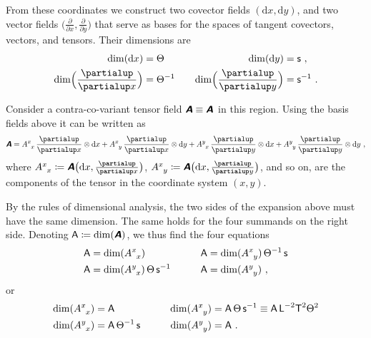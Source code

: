 \documentclass[\ifafour a4paper,12pt,\else a5paper,10pt,\fi%
onecolumn,oneside,article,%
british%
]{memoir}
\makeatletter
\theoremstyle{remark}
\theoremstyle{innote}
\newcommand*{\mathte}[1]{\textbf{\textit{\textsf{#1}}}}
\newcommand*{\de}{\partialup}%
\newcommand*{\di}{\mathrm{d}}%
\newcommand*{\defd}{\coloneqq}
\renewcommand*{\|}[1][]{\nonscript\,#1\vert\nonscript\;\mathopen{}}
\newcommand*{\q}{}%
\DeclareRobustCommand*{\q}{%
  \mathbin{\mathpalette\bigcdot@{}}%
}
\newcommand*{\bigcdot@scalefactor}{0.7}
\newcommand*{\bigcdot@widthfactor}{1.5}
\newcommand*{\bigcdot@}[2]{%
  \sbox0{$#1\vcenter{}$}%
  \sbox2{$#1\cdot\m@th$}%
  \hbox to \bigcdot@widthfactor\wd2{%
    \hfil
    \raise\ht0\hbox{%
      \scalebox{\bigcdot@scalefactor}{%
        \lower\ht0\hbox{$#1\bullet\m@th$}%
      }%
    }%
    \hfil
  }%
}
\newcommand*{\Le}{\textsf{L}}
\newcommand*{\Ti}{\textsf{T}}
\newcommand*{\Te}{\Theta}
\newcommand*{\Ent}{\textsf{s}}
\newcommand*{\Aa}{\textsf{A}}
\newcommand*{\yA}{\mathte{A}}
\renewcommand*{\i}{\indices}
\makeatother
\begin{document}
From these coordinates we construct two covector fields $(\di x, \di y)$,
and two vector fields $\bigl(\frac{\de}{\de x}, \frac{\de}{\de y}\bigr)$
that serve as bases for the spaces of tangent covectors, vectors, and
tensors. Their dimensions are
\begin{equation}
  \label{eq:example_basisvects2d}
  \begin{aligned}
    \dim(\di x)&=\Te &\quad \dim(\di y)&= \Ent \ ,
    \\
    \dim\Bigl(\frac{\de}{\de x}\Bigr)&=\Te^{-1} &\quad \dim\Bigl(\frac{\de}{\de y}\Bigr)&= \Ent^{-1} \ .
  \end{aligned}
\end{equation}


Consider a contra-co-variant tensor field $\yA \equiv \yA\i{^{\q}_{\q}}$ in
this region. Using the basis fields above it can be written as
\begin{equation}
  \label{eq:expansion_tensor_2d}
  \yA = 
  A\i{^{x}_{x}}\,\frac{\de}{\de x} \otimes\di x + 
  A\i{^{x}_{y}}\,\frac{\de}{\de x} \otimes\di y + 
  A\i{^{y}_{x}}\,\frac{\de}{\de y} \otimes\di x + 
  A\i{^{y}_{y}}\,\frac{\de}{\de y} \otimes\di y \ ,
\end{equation}
where $A\i{^{x}_{x}} \defd \yA\bigl(\di x, \frac{\de}{\de x}\bigr)$,
$A\i{^{x}_{y}} \defd \yA\bigl(\di x, \frac{\de}{\de y}\bigr)$, and so on,
are the components of the tensor in the coordinate system $(x, y)$.

By the rules of dimensional analysis, the two sides of the expansion above
must have the same dimension. The same holds for the four summands on the
right side. Denoting $\Aa \defd \dim(\yA)$, we thus find the four equations
\begin{equation*}
  \label{eq:four_dims_2d_pre}
  \begin{aligned}
    \Aa &= \dim(A\i{^{x}_{x}}) &\qquad \Aa &=
 \dim(A\i{^{x}_{y}})\,\Te^{-1}\,\Ent 
 \\
    \Aa &= \dim(A\i{^{y}_{x}})\,\Te\,\Ent^{-1} &\qquad \Aa &=
 \dim(A\i{^{y}_{y}}) \ ,
  \end{aligned}
\end{equation*}
or
\begin{equation}
  \label{eq:four_dims_2d}
  \begin{aligned}
    \dim(A\i{^{x}_{x}}) &= \Aa\, &\qquad 
 \dim(A\i{^{x}_{y}}) &=\Aa\,\Te\,\Ent^{-1} \equiv
\Aa\,\Le^{-2}\Ti^{2}\Te^{2}
    \\
    \dim(A\i{^{y}_{x}}) &= \Aa\,\Te^{-1}\,\Ent &\qquad
 \dim(A\i{^{y}_{y}}) &= \Aa \ .
  \end{aligned}
\end{equation}
\end{document}

